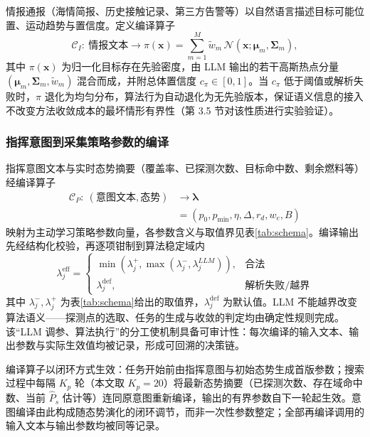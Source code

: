 \documentclass[a4paper,UTF8,zihao=5,twocolumn]{ctexart}
\numberwithin{equation}{section}
\begin{document}
情报通报（海情简报、历史接触记录、第三方告警等）以自然语言描述目标可能位置、运动趋势与置信度。定义编译算子
\begin{equation}
  \mathcal{C}_I:\ \text{情报文本}\longrightarrow \pi(\symbf{x})=\sum_{m=1}^{M}\tilde w_m\,\mathcal{N}(\symbf{x};\symbf{\mu}_m,\symbf{\Sigma}_m),
  \label{eq:compile-prior}
\end{equation}
其中 $\pi(\symbf{x})$ 为归一化目标存在先验密度，由 LLM 输出的若干高斯热点分量 $(\symbf{\mu}_m,\symbf{\Sigma}_m,\tilde w_m)$ 混合而成，并附总体置信度 $c_\pi\in[0,1]$。当 $c_\pi$ 低于阈值或解析失败时，$\pi$ 退化为均匀分布，算法行为自动退化为无先验版本，保证语义信息的接入不改变方法收敛成本的最坏情形有界性（第 3.5 节对该性质进行实验验证）。

\subsubsection{指挥意图到采集策略参数的编译}

指挥意图文本与实时态势摘要（覆盖率、已探测次数、目标命中数、剩余燃料等）经编译算子
\begin{equation}
  \begin{split}
    \mathcal{C}_P:\ (\text{意图文本},\text{态势})&\longrightarrow
    \symbf{\lambda}\\[-2pt]
    &=(p_0,p_{\min},\eta,\Delta,r_d,w_e,B)
  \end{split}
  \label{eq:compile-intent}
\end{equation}
映射为主动学习策略参数向量，各参数含义与取值界见表\ref{tab:schema}。编译输出先经结构化校验，再逐项钳制到算法稳定域内
\begin{equation}
  \lambda_j^{\mathrm{eff}}=
  \begin{cases}
    \min(\lambda_j^{+},\max(\lambda_j^{-},\lambda_j^{LLM})), & \text{合法}\\
    \lambda_j^{\mathrm{def}}, & \text{解析失败/越界}
  \end{cases}
  \label{eq:clamp}
\end{equation}
其中 $\lambda_j^{-},\lambda_j^{+}$ 为表\ref{tab:schema}给出的取值界，$\lambda_j^{\mathrm{def}}$ 为默认值。LLM 不能越界改变算法语义——探测点的选取、任务的生成与收敛的判定均由确定性规则完成。该“LLM 调参、算法执行”的分工使机制具备可审计性：每次编译的输入文本、输出参数与实际生效值均被记录，形成可回溯的决策链。

编译算子以闭环方式生效：任务开始前由指挥意图与初始态势生成首版参数；搜索过程中每隔 $K_p$ 轮（本文取 $K_p=20$）将最新态势摘要（已探测次数、存在域命中数、当前 $\hat P_s$ 估计等）连同原意图重新编译，输出的有界参数自下一轮起生效。意图编译由此构成随态势演化的闭环调节，而非一次性参数整定；全部再编译调用的输入文本与输出参数均被同等记录。
\end{document}
